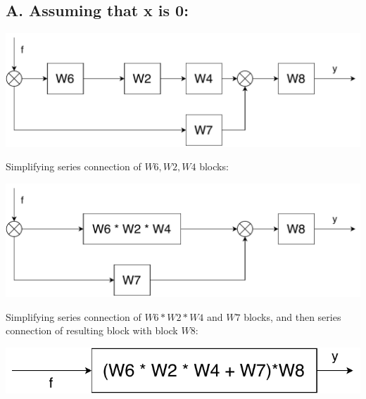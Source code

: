 \documentclass[a4paper,12pt]{article}
\begin{document}
    \subsection*{A. Assuming that x is 0:}
    \begin{center}
        \includegraphics[width=0.8\linewidth]{../Task5/T5Step1.pdf}
    \end{center}
    Simplifying series connection of $W6, W2, W4$ blocks:
    \begin{center}
        \includegraphics[width=0.8\linewidth]{../Task5/T5Step2.pdf}
    \end{center}
    Simplifying series connection of $W6*W2*W4$ and $W7$ blocks, and then series 
    connection of resulting block with block $W8$:
    \begin{center}
        \includegraphics[width=\linewidth/2]{../Task5/T5Step3.pdf}
    \end{center}
\end{document}
